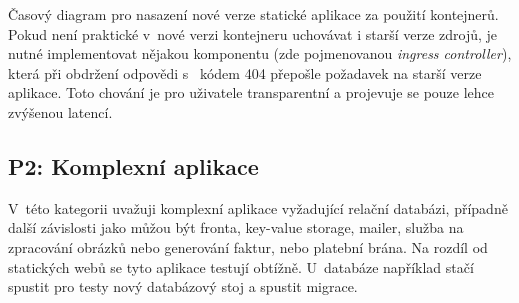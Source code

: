         \begin{iffigure}
            \centering
            \caption{Časový diagram pro nasazení nové verze statické aplikace za použití kontejnerů. Pokud není praktické v~nové verzi kontejneru uchovávat i starší verze zdrojů, je nutné implementovat nějakou komponentu (zde pojmenovanou \textit{ingress controller}), která při obdržení odpovědi s~ kódem 404 přepošle požadavek na starší verze aplikace. Toto chování je pro uživatele transparentní a projevuje se pouze lehce zvýšenou latencí.}
            \label{fig:static-deploy-container}
        \end{iffigure}

    \newpage
    \subsection{P2: Komplexní aplikace}
        V~této kategorii uvažuji komplexní aplikace vyžadující relační databázi, případně další závislosti jako můžou být fronta, key-value storage, mailer, služba na zpracování obrázků nebo generování faktur, nebo platební brána. Na rozdíl od statických webů se tyto aplikace testují obtížně. U~databáze například stačí spustit pro testy nový databázový stoj a spustit migrace.

